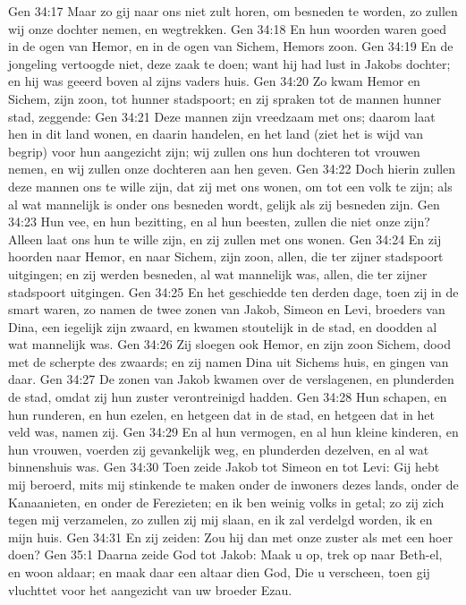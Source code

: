 Gen 34:17  Maar zo gij naar ons niet zult horen, om besneden te worden, zo zullen wij onze dochter nemen, en wegtrekken.
Gen 34:18  En hun woorden waren goed in de ogen van Hemor, en in de ogen van Sichem, Hemors zoon.
Gen 34:19  En de jongeling vertoogde niet, deze zaak te doen; want hij had lust in Jakobs dochter; en hij was geeerd boven al zijns vaders huis.
Gen 34:20  Zo kwam Hemor en Sichem, zijn zoon, tot hunner stadspoort; en zij spraken tot de mannen hunner stad, zeggende:
Gen 34:21  Deze mannen zijn vreedzaam met ons; daarom laat hen in dit land wonen, en daarin handelen, en het land (ziet het is wijd van begrip) voor hun aangezicht zijn; wij zullen ons hun dochteren tot vrouwen nemen, en wij zullen onze dochteren aan hen geven.
Gen 34:22  Doch hierin zullen deze mannen ons te wille zijn, dat zij met ons wonen, om tot een volk te zijn; als al wat mannelijk is onder ons besneden wordt, gelijk als zij besneden zijn.
Gen 34:23  Hun vee, en hun bezitting, en al hun beesten, zullen die niet onze zijn? Alleen laat ons hun te wille zijn, en zij zullen met ons wonen.
Gen 34:24  En zij hoorden naar Hemor, en naar Sichem, zijn zoon, allen, die ter zijner stadspoort uitgingen; en zij werden besneden, al wat mannelijk was, allen, die ter zijner stadspoort uitgingen.
Gen 34:25  En het geschiedde ten derden dage, toen zij in de smart waren, zo namen de twee zonen van Jakob, Simeon en Levi, broeders van Dina, een iegelijk zijn zwaard, en kwamen stoutelijk in de stad, en doodden al wat mannelijk was.
Gen 34:26  Zij sloegen ook Hemor, en zijn zoon Sichem, dood met de scherpte des zwaards; en zij namen Dina uit Sichems huis, en gingen van daar.
Gen 34:27  De zonen van Jakob kwamen over de verslagenen, en plunderden de stad, omdat zij hun zuster verontreinigd hadden.
Gen 34:28  Hun schapen, en hun runderen, en hun ezelen, en hetgeen dat in de stad, en hetgeen dat in het veld was, namen zij.
Gen 34:29  En al hun vermogen, en al hun kleine kinderen, en hun vrouwen, voerden zij gevankelijk weg, en plunderden dezelven, en al wat binnenshuis was.
Gen 34:30  Toen zeide Jakob tot Simeon en tot Levi: Gij hebt mij beroerd, mits mij stinkende te maken onder de inwoners dezes lands, onder de Kanaanieten, en onder de Ferezieten; en ik ben weinig volks in getal; zo zij zich tegen mij verzamelen, zo zullen zij mij slaan, en ik zal verdelgd worden, ik en mijn huis.
Gen 34:31  En zij zeiden: Zou hij dan met onze zuster als met een hoer doen?
Gen 35:1  Daarna zeide God tot Jakob: Maak u op, trek op naar Beth-el, en woon aldaar; en maak daar een altaar dien God, Die u verscheen, toen gij vluchttet voor het aangezicht van uw broeder Ezau.
